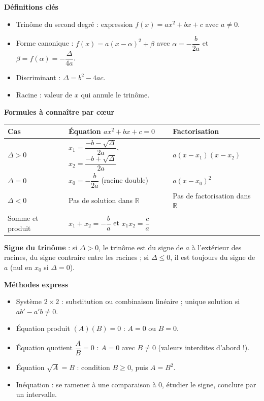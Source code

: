 \documentclass[11pt]{article}
\newcommand{\cle}[1]{{\popxbold\color{popdark}#1}}
\begin{document}
\begin{bilan}
\textbf{Définitions clés}
\begin{itemize}
\item \cle{Trinôme du second degré} : expression $f(x)=ax^2+bx+c$ avec $a\neq 0$.
\item \cle{Forme canonique} : $f(x)=a(x-\alpha)^2+\beta$ avec $\alpha=-\dfrac{b}{2a}$ et $\beta=f(\alpha)=-\dfrac{\Delta}{4a}$.
\item \cle{Discriminant} : $\Delta=b^2-4ac$.
\item \cle{Racine} : valeur de $x$ qui annule le trinôme.
\end{itemize}

\textbf{Formules à connaître par cœur}
\begin{center}
\begin{tabularx}{\linewidth}{|l|X|X|}
\hline
\rowcolor{popblueL} \textbf{Cas} & \textbf{Équation $ax^2+bx+c=0$} & \textbf{Factorisation} \\
\hline
$\Delta>0$ & $x_1=\dfrac{-b-\sqrt{\Delta}}{2a}$, $x_2=\dfrac{-b+\sqrt{\Delta}}{2a}$ & $a(x-x_1)(x-x_2)$ \\
\hline
$\Delta=0$ & $x_0=-\dfrac{b}{2a}$ (racine double) & $a(x-x_0)^2$ \\
\hline
$\Delta<0$ & Pas de solution dans $\mathbb{R}$ & Pas de factorisation dans $\mathbb{R}$ \\
\hline
Somme et produit & \multicolumn{2}{X|}{$x_1+x_2=-\dfrac{b}{a}$ \quad et \quad $x_1x_2=\dfrac{c}{a}$} \\
\hline
\end{tabularx}
\end{center}

\textbf{Signe du trinôme} : si $\Delta>0$, le trinôme est du \cle{signe de $a$} à l'extérieur des racines, du signe contraire entre les racines ; si $\Delta\leq 0$, il est toujours du signe de $a$ (nul en $x_0$ si $\Delta=0$).

\textbf{Méthodes express}
\begin{itemize}
\item \cle{Système $2\times 2$} : substitution ou combinaison linéaire ; unique solution si $ab'-a'b\neq 0$.
\item \cle{Équation produit} $(A)(B)=0$ : $A=0$ ou $B=0$.
\item \cle{Équation quotient} $\dfrac{A}{B}=0$ : $A=0$ avec $B\neq 0$ (valeurs interdites d'abord !).
\item \cle{Équation} $\sqrt{A}=B$ : condition $B\geq 0$, puis $A=B^2$.
\item \cle{Inéquation} : se ramener à une comparaison à $0$, étudier le signe, conclure par un intervalle.
\end{itemize}
\end{bilan}
\end{document}
